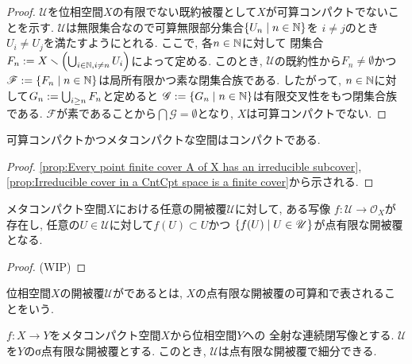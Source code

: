 \documentclass[uplatex, dvipdfmx, a4paper, 12pt, class=jsbook, crop=false]{standalone}
\begin{document}
\begin{proof}
	$ \mathscr{U} $を位相空間$ X $の有限でない既約被覆として$ X $が可算コンパクトでないことを示す. 
	$ \mathscr{U} $は無限集合なので可算無限部分集合$ \setcomp{U_n}{n \in \N} $を
	$ i \neq j $のとき$ U_i \neq U_j $を満たすようにとれる. ここで, 各$ n \in \mathbb{N} $に対して
	閉集合$ F_n \mathrel{:=} X \smallsetminus \left(\bigcup_{i \in \mathbb{N}, i \neq n} U_i\right) $によって定める.
	このとき, $ \mathscr{U} $の既約性から$ F_n \neq \emptyset $かつ
	$ \mathscr{F} \defeq \setcomp{F_n}{n \in \N} $は局所有限かつ素な閉集合族である.
	したがって, $ n \in \mathbb{N} $に対して$ G_n \mathrel{:=} \bigcup_{i \geq n} F_n $と定めると
	$ \mathscr{G} \defeq \setcomp{G_n}{n \in \N} $は有限交叉性をもつ閉集合族である.
	$ \mathscr{F} $が素であることから$ \bigcap \mathscr{G} = \emptyset $となり, $ X $は可算コンパクトでない.
\end{proof}

\begin{proposition}
	\label{prop:CntCpt + MetaCpt > Cpt}
	可算コンパクトかつメタコンパクトな空間はコンパクトである.
\end{proposition}

\begin{proof} 
	\cref{prop:Every point finite cover A of X has an irreducible subcover}, 
	\cref{prop:Irreducible cover in a CntCpt space is a finite cover}から示される.
\end{proof}

\begin{proposition}
	\label{prop: A method to choose an useful refinement of a open cover of a metacompact space}
	メタコンパクト空間$ X $における任意の開被覆$ \mathscr{U} $に対して, ある写像
	$ f \colon \mathscr{U} \to \mathcal{O}_X $が存在し, 
	任意の$ U \in \mathscr{U} $に対して$ f(U) \subset U $かつ
	$ \setcomp{f(U)}{U \in \mathscr{U}} $が点有限な開被覆となる.
\end{proposition}

\begin{proof}
	(WIP)
\end{proof}

\begin{definition}
	位相空間$ X $の開被覆$ \mathscr{U} $がであるとは, 
	$ X $の点有限な開被覆の可算和で表されることをいう.
\end{definition}

\begin{proposition}
	\label{prop: Every sigma-point-finite open covering of the closed image of a MetaCpt space has point a finite refinement}
	$ f \colon X \to Y $をメタコンパクト空間$ X $から位相空間$ Y $への
	全射な連続閉写像とする.
	$ \mathscr{U} $を$ Y $のσ点有限な開被覆とする.
	このとき, $ \mathscr{U} $は点有限な開被覆で細分できる.
\end{proposition}
\end{document}
